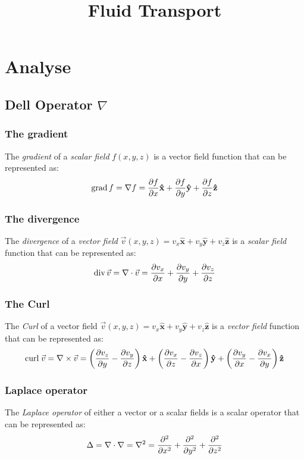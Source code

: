 \documentclass[twocolumn]{article}
\title{Fluid Transport}
\date{\vspace{-6ex}}
\numberwithin{equation}{section}
\begin{document}
\maketitle


	\section{Analyse}
		\subsection{Dell Operator $\nabla$}

			\subsubsection{The gradient}
The \emph{gradient} of a \emph{scalar field} $f(x,y,z)$ is a vector field function that can be represented as:
\[ \mbox{grad}\, f = \nabla f = {\partial f \over \partial x} \mathbf{\hat{x}} + {\partial f \over \partial y} \mathbf{\hat{y}} + {\partial f \over \partial z} \mathbf{\hat{z}}\]

			\subsubsection{The divergence}
The \emph{divergence} of a \emph{vector field} $\vec{v}(x, y, z) = v_x \mathbf{\hat{x}}  + v_y \mathbf{\hat{y}} + v_z \mathbf{\hat{z}}$ is a \emph{scalar field} function that can be represented as:
\[\mbox{div}\,\vec v = \nabla \cdot \vec v = {\partial v_x \over \partial x} + {\partial v_y \over \partial y} + {\partial v_z \over \partial z} \]

			\subsubsection{The Curl}
The \emph{Curl} of a vector field $\vec{v}(x, y, z) = v_x\mathbf{\hat{x}}  + v_y\mathbf{\hat{y}} + v_z\mathbf{\hat{z}}$ is a \emph{vector field} function that can be represented as:
\[\mbox{curl}\;\vec v = \nabla \times \vec v =\left( {\partial v_z \over \partial y} - {\partial v_y \over \partial z} \right) \mathbf{\hat{x}} + \left( {\partial v_x \over \partial z} - {\partial v_z \over \partial x} \right) \mathbf{\hat{y}} + \left( {\partial v_y \over \partial x} - {\partial v_x \over \partial y} \right) \mathbf{\hat{z}} \]


			\subsubsection{Laplace operator}
The \emph{Laplace operator} of either a vector or a scalar fields is a scalar operator that can be represented as:
\[\Delta = \nabla \cdot \nabla = \nabla^2={\partial^2 \over \partial x^2} + {\partial^2 \over \partial y^2} + {\partial^2 \over \partial z^2} \]
\end{document}
